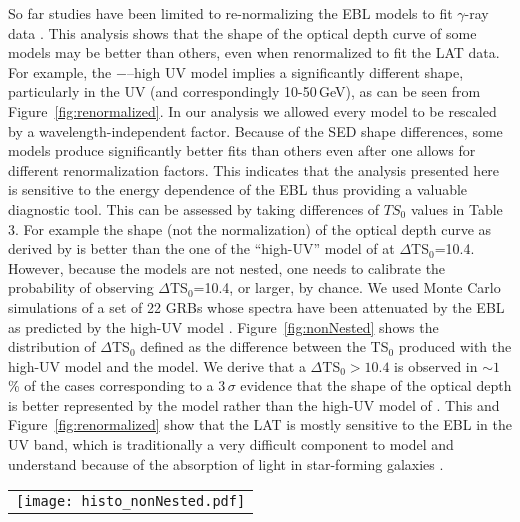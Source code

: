 \documentclass[12pt,preprint]{aastex}
\begin{document}
So far studies have been limited to re-normalizing the EBL models to fit $\gamma$-ray data
\citep[][]{ebl12,hess_ebl12}. This analysis shows that the shape
of the optical depth curve of some models may { be} better than others, even when renormalized 
to fit the LAT data. For example, the \cite{kneiske04}$-–$high UV model implies a
significantly different shape, particularly in the UV (and
correspondingly 10-50\,GeV), as can be
seen from Figure~\ref{fig:renormalized}. In our analysis we allowed every model to be rescaled
by a wavelength-independent factor. Because of the SED shape differences, some models
produce significantly better fits than others even after one allows for different renormalization
factors. This indicates that the analysis presented here is sensitive to the energy dependence of
the EBL thus providing a valuable diagnostic tool. This can be assessed by taking differences
of $TS_0$ values in Table 3. For example the shape (not the normalization) of the optical depth
curve as derived by \cite{dominguez11} is better than the one of the “high-UV” model
of \cite{kneiske04} at {$\Delta$TS$_0$=10.4. However, because the
models are not nested, one needs to calibrate the probability
of observing $\Delta$TS$_0$=10.4, or larger, by chance. We used Monte Carlo simulations of a set of 22 GRBs whose
spectra have been attenuated by the EBL as predicted by the high-UV
model \cite{kneiske04}. Figure~\ref{fig:nonNested} shows the
distribution of $\Delta$TS$_0$ defined as the difference between the
TS$_0$ produced with the \cite{kneiske04} high-UV model and the
\cite{dominguez11} model. We derive that a $\Delta$TS$_0>10.4$ is
observed in $\sim1$\,\% of the cases corresponding to a 3\,$\sigma$
evidence that the shape of the optical depth is better represented by
the \cite{dominguez11} model rather than the high-UV model of
\cite{kneiske04}. This and Figure~\ref{fig:renormalized} show that the LAT is mostly sensitive to the EBL in the UV band, which is
traditionally a very difficult component to model and understand because of
the absorption of light in star-forming galaxies \citep{helgason12}.
}



\begin{figure*}[ht!]
  \begin{center}
  \begin{tabular}{c}
    \texttt{[image: histo\_nonNested.pdf]} 
\end{tabular}
  \end{center}
  \caption{Distribution obtained from simulations of the $\Delta$TS, when comparing the TS$_0$
    of two different models, in the null hypothesis regime.  In this
    case the simulation adopted the high-UV EBL model of
    \cite{kneiske04}. The arrow
    shows the $\Delta$TS=10.4 value observed in the real data (see Table~\ref{tab:cresults}).} 
\label{fig:nonNested}
\end{figure*}
\end{document}
